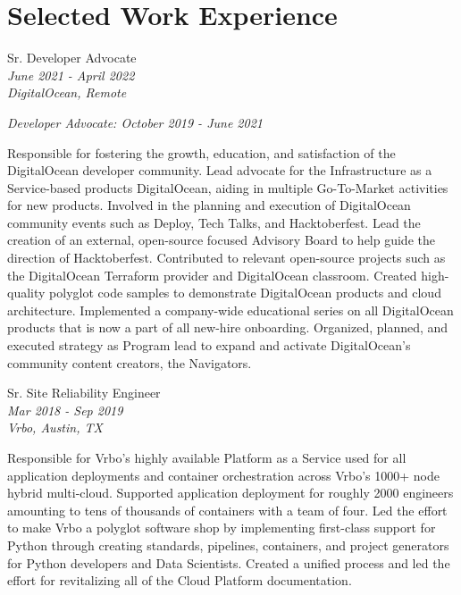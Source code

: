 \documentclass[10pt]{article} %
\begin{document}
\begin{minipage}[t]{0.5\textwidth} %
\vspace{0pt}  %
\section{Selected Work Experience}


{\raggedright\large Sr. Developer Advocate\\
\small \textit{June 2021 - April 2022}\\
\small \textit{DigitalOcean, Remote} \\
\raggedright\small \textit{Developer Advocate: October 2019 - June 2021}\\[5pt]}

\normalsize{
    Responsible for fostering the growth, education, and satisfaction of the DigitalOcean developer community. Lead advocate for the Infrastructure as a Service-based products DigitalOcean, aiding in multiple Go-To-Market activities for new products. Involved in the planning and execution of DigitalOcean community events such as Deploy, Tech Talks, and Hacktoberfest. Lead the creation of an external, open-source focused Advisory Board to help guide the direction of Hacktoberfest. Contributed to relevant open-source projects such as the DigitalOcean Terraform provider and DigitalOcean classroom. Created high-quality polyglot code samples to demonstrate DigitalOcean products and cloud architecture. Implemented a company-wide educational series on all DigitalOcean products that is now a part of all new-hire onboarding. Organized, planned, and executed strategy as Program lead to expand and activate DigitalOcean's community content creators, the Navigators. \\
}

{\raggedright\large Sr. Site Reliability Engineer\\
\small \textit{Mar 2018 - Sep 2019}\\
\small \textit{Vrbo, Austin, TX} \\}

\normalsize{Responsible for Vrbo's highly available Platform as a Service used for all application deployments and container orchestration across Vrbo's 1000+ node hybrid multi-cloud. Supported application deployment for roughly 2000 engineers amounting to tens of thousands of containers with a team of four. Led the effort to make Vrbo a polyglot software shop by implementing first-class support for Python through creating standards, pipelines, containers, and project generators for Python developers and Data Scientists. Created a unified process and led the effort for revitalizing all of the Cloud Platform documentation. }\\


\end{minipage}
\end{document}
